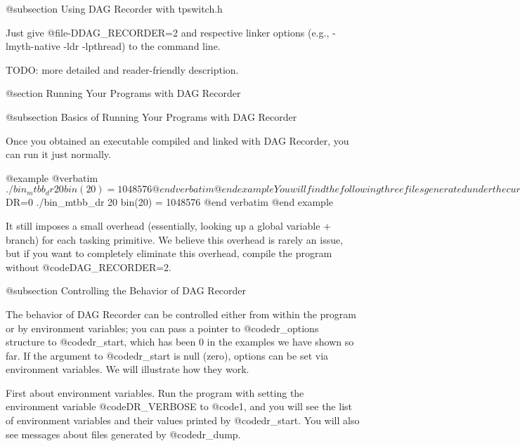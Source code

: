 @subsection Using DAG Recorder with tpswitch.h

Just give @file{-DDAG_RECORDER=2} 
and respective linker options (e.g., -lmyth-native -ldr -lpthread)
to the command line.

TODO: more detailed and reader-friendly description.

@section Running Your Programs with DAG Recorder

@subsection Basics of Running Your Programs with DAG Recorder

Once you obtained an executable compiled and linked with DAG Recorder, you can run it just normally.  

@example 
@verbatim
$ ./bin_mtbb_dr 20
bin(20) = 1048576
@end verbatim
@end example

You will find the following three files generated under the current directory.
@itemize @bullet
@item @file{00dr.dag} --- The DAG file. This is the primary file generated by DAG Recorder, from which other files are derived
@item @file{00dr.gpl} --- The parallelism file.  This is a file showing the actual and available parallelism, in a gnuplot format. 
@item @file{00dr.stat} --- The summary stat file.  This is a text file showing, among others, the number of tasks, total work time (time spent in the application code), critical path, the number of steals, etc.  The contents of this file will be explained later.
@end itemize

Run this program with setting environment variable @code{DR=0}, and you
can run the program with DAG Recorder turned off.

@example 
@verbatim
$ DR=0 ./bin_mtbb_dr 20
bin(20) = 1048576
@end verbatim
@end example

It still imposes a small overhead (essentially, looking up a global
variable + branch) for each tasking primitive.  We believe this overhead
is rarely an issue, but if you want to completely eliminate this
overhead, compile the program without @code{DAG_RECORDER=2}.

@subsection Controlling the Behavior of DAG Recorder

The behavior of DAG Recorder can be controlled either from within the
program or by environment variables; you can pass a pointer to
@code{dr_options} structure to @code{dr_start}, which has been 0 in the
examples we have shown so far.  If the argument to @code{dr_start} is
null (zero), options can be set via environment variables.  We will
illustrate how they work.

First about environment variables.  Run the program with setting the
environment variable @code{DR_VERBOSE} to @code{1}, and you will see the
list of environment variables and their values printed by
@code{dr_start}.  You will also see messages about files generated by
@code{dr_dump}.

